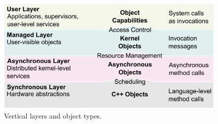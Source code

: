 
\begin{figure}
  \centering
  \includegraphics[scale=1]{slides/figures/layers.pdf}
  \caption{Vertical layers and object types.}
  \label{fig:layers}
\end{figure}

